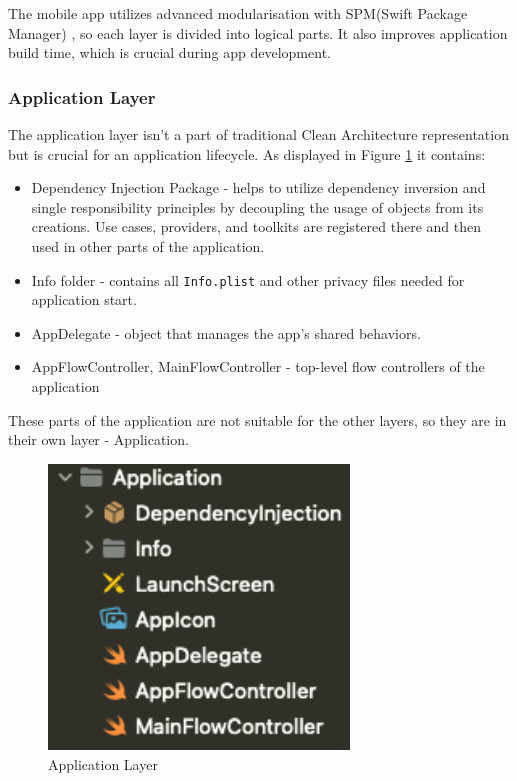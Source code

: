 \documentclass[
  biblatex = false,
  language=english,
  figures=false,
  sourcecodes,
  glossaries,
  index
]{kidiplom}
\begin{document}
The mobile app utilizes advanced modularisation with SPM(Swift Package Manager) \cite{bib8}, so each layer is divided into logical parts. It also improves application build time, which is crucial during app development.

\subsubsection{Application Layer}
The application layer isn't a part of traditional Clean Architecture representation but is crucial for an application lifecycle. As displayed in Figure \ref{fig:image5} it contains:
\begin{itemize}
	\item Dependency Injection Package - helps to utilize dependency inversion and single responsibility principles by decoupling the usage of objects from its creations. Use cases, providers, and toolkits are registered there and then used in other parts of the application.
	\item Info folder - contains all \texttt{Info.plist} and other privacy files needed for application start.
	\item AppDelegate - object that manages the app's shared behaviors.
	\item AppFlowController, MainFlowController - top-level flow controllers of the application
\end{itemize}

These parts of the application are not suitable for the other layers, so they are in their own layer - Application.

\begin{figure}[h]
\centering
\includegraphics[width=8cm]{image5}
\caption{Application Layer}
\label{fig:image5}
\end{figure}
\end{document}
